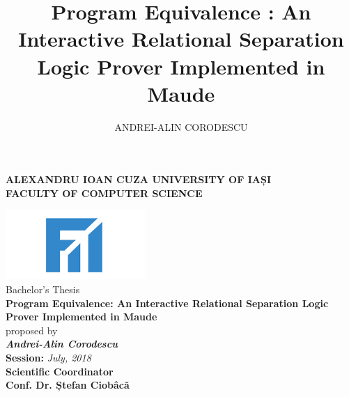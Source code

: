 \documentclass[12pt,a4paper]{article}
\author{ANDREI-ALIN CORODESCU}
\title{Program Equivalence : An Interactive Relational Separation Logic Prover Implemented in Maude}
\begin{document}
	\begin{titlepage}
		\begin{center}
			\textbf{
				ALEXANDRU IOAN CUZA UNIVERSITY OF IAȘI
			}
			\\
			\large{\textbf{FACULTY OF COMPUTER SCIENCE}}
		\end{center}
		\vspace{10mm}
		\begin{center}
			\includegraphics{pictures/fii.png}
			\\
			\vspace{15mm}
			\Large{Bachelor's Thesis}
			\\
			\vspace{10mm}
			\Large\textbf {Program Equivalence: An Interactive Relational Separation Logic Prover Implemented in Maude}\\
			\vspace{15mm}
			\large{proposed by}
			\\
			\vspace{15mm}
			\textbf{\large\textit {Andrei-Alin Corodescu}}
			\\
			\vspace{30mm}
			\textbf{Session: }\textit{July, 2018}\\
			\vspace{20mm}
			\textbf{Scientific Coordinator}\\
			\large{\textbf{Conf. Dr. Ștefan Ciobâcă}}
			\vspace{30mm}
		\end{center}
	\end{titlepage}
\end{document}
